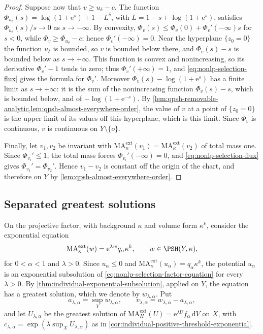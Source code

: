 \begin{proof}
Suppose now that $v\geq u_\delta-c$. The function $\Phi_{u_\delta}(s)=\log(1+\mathrm{e}^s)+1-L^\delta$, with $L=1-s+\log(1+\mathrm{e}^s)$, satisfies $\Phi_{u_\delta}(s)/s\to0$ as $s\to-\infty$. By convexity, $\Phi_v(s)\leq\Phi_v(0)+\Phi_v'(-\infty)s$ for $s<0$, while $\Phi_v\geq\Phi_{u_\delta}-c$; hence $\Phi_v'(-\infty)=0$. Near the hyperplane $\{z_0=0\}$ the function $u_\delta$ is bounded, so $v$ is bounded below there, and $\Phi_v(s)-s$ is bounded below as $s\to+\infty$. This function is convex and nonincreasing, so its derivative $\Phi_v'-1$ tends to zero; thus $\Phi_v'(+\infty)=1$, and \eqref{eq:nonlp-selection-flux} gives the formula for $\Phi_v'$. Moreover $\Phi_v(s)-\log(1+\mathrm{e}^s)$ has a finite limit as $s\to+\infty$: it is the sum of the nonincreasing function $\Phi_v(s)-s$, which is bounded below, and of $-\log(1+\mathrm{e}^{-s})$. By \cref{lem:qpsh-removable-analytic,lem:qpsh-almost-everywhere-order}, the value of $v$ at a point of $\{z_0=0\}$ is the upper limit of its values off this hyperplane, which is this limit. Since $\Phi_v$ is continuous, $v$ is continuous on $Y\setminus\{o\}$.

Finally, let $v_1,v_2$ be invariant with $\mathrm{MA}^{\mathrm{ext}}_\kappa(v_1)=\mathrm{MA}^{\mathrm{ext}}_\kappa(v_2)$ of total mass one. Since $\Phi_{v_i}'\leq1$, the total mass forces $\Phi_{v_i}'(-\infty)=0$, and \eqref{eq:nonlp-selection-flux} gives $\Phi_{v_1}'=\Phi_{v_2}'$. Hence $v_1-v_2$ is constant off the origin of the chart, and therefore on $Y$ by \cref{lem:qpsh-almost-everywhere-order}.
\end{proof}

\subsection{Separated greatest solutions}

On the projective factor, with background $\kappa$ and volume form $\kappa^k$, consider the exponential equation
\begin{equation}\label{eq:nonlp-selection-factor-equation}
 \mathrm{MA}^{\mathrm{ext}}_\kappa(w)=\mathrm{e}^{\lambda w}q_\alpha\kappa^k,\qquad w\in\PSH(Y,\kappa),
\end{equation}
for $0<\alpha<1$ and $\lambda>0$. Since $u_\alpha\leq0$ and $\mathrm{MA}^{\mathrm{ext}}_\kappa(u_\alpha)=q_\alpha\kappa^k$, the potential $u_\alpha$ is an exponential subsolution of \eqref{eq:nonlp-selection-factor-equation} for every $\lambda>0$. By \cref{thm:individual-exponential-subsolution}, applied on $Y$, the equation has a greatest solution, which we denote by $w_{\lambda,\alpha}$. Put
\[
 a_{\lambda,\alpha}=\sup_Yw_{\lambda,\alpha},\qquad
 v_{\lambda,\alpha}=w_{\lambda,\alpha}-a_{\lambda,\alpha},
\]
and let $U_{\lambda,\alpha}$ be the greatest solution of $\mathrm{MA}^{\mathrm{ext}}_H(U)=\mathrm{e}^{\lambda U}f_\alpha\,\mathrm{d}V$ on $X$, with $c_{\lambda,\alpha}=\exp(\lambda\sup_XU_{\lambda,\alpha})$ as in \cref{cor:individual-positive-threshold-exponential}.

